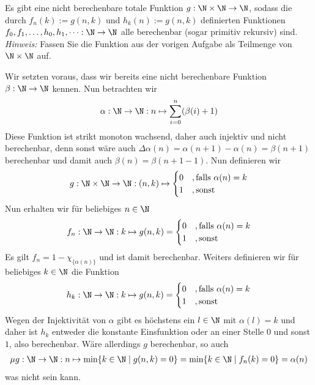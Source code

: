 
\begin{exercise}[200]

Es gibt eine nicht berechenbare totale Funktion $g: \N \times \N \to \N$, sodass
die durch $f_n(k) := g(n,k)$ und $h_k(n) := g(n,k)$ definierten Funktionen
$f_0,f_1,\dots,h_0,h_1,\dots: \N \to \N$ alle berechenbar (sogar primitiv rekursiv) sind. \\
\textit{Hinweis:} Fassen Sie die Funktion aus der vorigen Aufgabe als Teilmenge von
$\N \times \N$ auf.

\end{exercise}


\begin{solution}

	Wir setzten voraus, dass wir bereits eine nicht berechenbare Funktion $\beta: \N \to \N$ kennen. Nun betrachten wir 
	\begin{align*}
	\alpha: \N \to \N: n \mapsto \sum_{i = 0}^n (\beta(i) + 1)
	\end{align*}
	Diese Funktion ist strikt monoton wachsend, daher auch injektiv und nicht berechenbar, denn sonst wäre auch $\Delta\alpha(n) = \alpha(n + 1) - \alpha(n) = \beta(n+1)$ berechenbar und damit auch $\beta(n) = \beta(n + 1 - 1)$. Nun definieren wir 
	\begin{align*}
	g: \N \times \N \to \N : (n, k) \mapsto 
	\begin{cases}
	0 &, \text{falls }\alpha(n) = k \\
	1 &, \text{sonst}
	\end{cases}
	\end{align*}
	Nun erhalten wir für beliebiges $n \in \N$ 
	\begin{align*}
	f_n: \N \to \N : k \mapsto g(n,k) =  
	\begin{cases}
	0 &, \text{falls } \alpha(n) = k \\
	1 &, \text{sonst}
	\end{cases}
	\end{align*}
	Es gilt $f_n = 1 - \chi_{\{\alpha(n)\}}$ und ist damit berechenbar. Weiters definieren wir für beliebiges $k \in \N$ die Funktion
	\begin{align*}
	h_k: \N \to \N : k \mapsto g(n,k) =  
	\begin{cases}
	0 &, \text{falls } \alpha(n) = k \\
	1 &, \text{sonst}
	\end{cases}
	\end{align*}
	Wegen der Injektivität von $\alpha$ gibt es höchstens ein $l \in \N$ mit $\alpha(l) = k$ und daher ist $h_k$ entweder die konstante Einsfunktion oder an einer Stelle $0$ und sonst $1$, also berechenbar.
	Wäre allerdings $g$ berechenbar, so auch
	\begin{align*}
	\mu g:  \N \to \N: n \mapsto \min\{k \in \N \mid g(n,k) = 0\} = \min\{k \in \N \mid f_n(k) = 0\} = \alpha(n)
	\end{align*}
	was nicht sein kann.
\end{solution}
